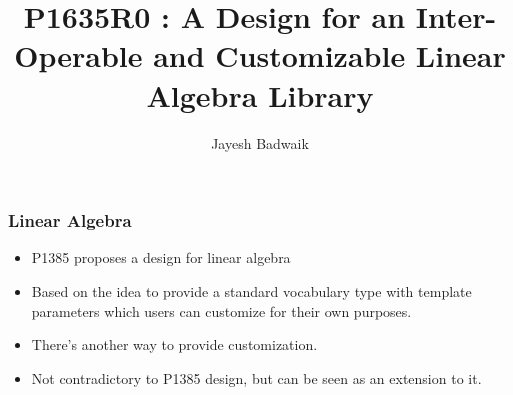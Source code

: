 \documentclass[12pt]{jbeamer}
\title[P1635R0]{P1635R0 : A Design for an Inter-Operable and Customizable Linear
Algebra Library}
\author{Jayesh Badwaik}
\begin{document}
\maketitle

\begin{frame}
  \frametitle{Linear Algebra}

  \begin{itemize}
    \item P1385 proposes a design for linear algebra
    \item Based on the idea to provide a standard vocabulary type with template
      parameters which users can customize for their own purposes.
    \item There's another way to provide customization.
    \item Not contradictory to P1385 design, but can be seen as an extension to
      it.
  \end{itemize}
\end{frame}

\begin{frame}
  \frametitle{}
\end{frame}
\end{document}
